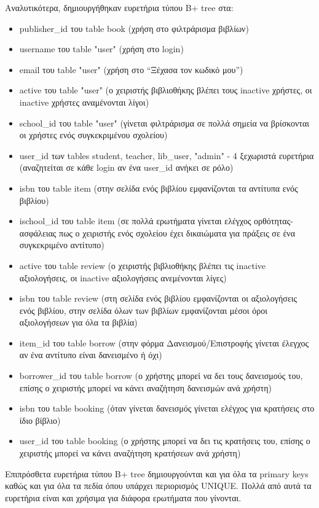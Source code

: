 \documentclass[a4paper]{article}
\begin{document}
\par Αναλυτικότερα, δημιουργήθηκαν ευρετήρια τύπου B+ tree στα:
\begin{itemize}
    \item publisher\_id του table book (χρήση στο φιλτράρισμα βιβλίων)
    \item username του table "user" (χρήση στο login)
    \item email του table "user" (χρήση στο ``Ξέχασα τον κωδικό μου'')
    \item active του table "user" (ο χειριστής βιβλιοθήκης βλέπει τους inactive χρήστες, οι inactive χρήστες αναμένονται λίγοι)
    \item school\_id του table "user" (γίνεται φιλτράρισμα σε πολλά σημεία να βρίσκονται οι χρήστες ενός συγκεκριμένου σχολείου)
    \item user\_id των tables student, teacher, lib\_user, "admin" - 4 ξεχωριστά ευρετήρια (αναζητείται σε κάθε login αν ένα user\_id ανήκει σε ρόλο)
    \item isbn του table item (στην σελίδα ενός βιβλίου εμφανίζονται τα αντίτυπα ενός βιβλίου)
    \item ischool\_id του table item (σε πολλά ερωτήματα γίνεται ελέγχος ορθότητας-ασφάλειας πως ο χειριστής ενός σχολείου έχει δικαιώματα για πράξεις σε ένα συγκεκριμένο αντίτυπο)
    \item active του table review (ο χειριστής βιβλιοθήκης βλέπει τις inactive αξιολογήσεις, οι inactive αξιολογήσεις ανεμένονται λίγες)
    \item isbn του table review (στη σελίδα ενός βιβλίου εμφανίζονται οι αξιολογήσεις ενός βιβλίου, στην σελίδα όλων των βιβλίων εμφανίζονται μέσοι όροι αξιολογήσεων για όλα τα βιβλία)
    \item item\_id του table borrow (στην φόρμα Δανεισμού/Επιστροφής γίνεται έλεγχος αν ένα αντίτυπο είναι δανεισμένο ή όχι)
    \item borrower\_id του table borrow (ο χρήστης μπορεί να δει τους δανεισμούς του, επίσης ο χειριστής μπορεί να κάνει αναζήτηση δανεισμών ανά χρήστη)
    \item isbn του table booking (όταν γίνεται δανεισμός γίνεται ελέγχος για κρατήσεις στο ίδιο βίβλιο)
    \item user\_id του table booking (ο χρήστης μπορεί να δει τις κρατήσεις του, επίσης ο χειριστής μπορεί να κάνει αναζήτηση κρατήσεων ανά χρήστη)
\end{itemize}
\par Επιπρόσθετα ευρετήρια τύπου B+ tree δημιουργούνται και για όλα τα primary keys καθώς και για όλα τα πεδία όπου υπάρχει περιορισμός UNIQUE. Πολλά από αυτά τα ευρετήρια είναι και χρήσιμα για διάφορα ερωτήματα που γίνονται.
\end{document}
